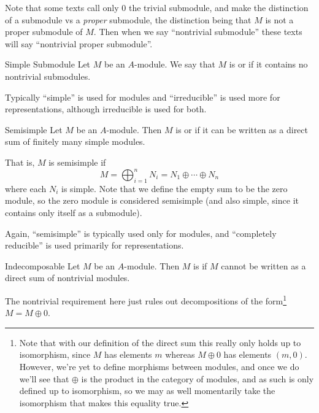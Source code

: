 \documentclass[fleqn]{NotesClass}
\begin{document}
    Note that some texts call only \(0\) the trivial submodule, and make the distinction of a submodule vs a \emph{proper} submodule, the distinction being that \(M\) is not a proper submodule of \(M\).
    Then when we say \enquote{nontrivial submodule} these texts will say \enquote{nontrivial proper submodule}.
    
    \begin{dfn}{Simple Submodule}{}
        Let \(M\) be an \(A\)-module.
        We say that \(M\) is  or  if it contains no nontrivial submodules.
    \end{dfn}
    
    Typically \enquote{simple} is used for modules and \enquote{irreducible} is used more for representations, although irreducible is used for both.
    
    \begin{dfn}{Semisimple}{}
        Let \(M\) be an \(A\)-module.
        Then \(M\) is  or  if it can be written as a direct sum of finitely many simple modules.
    \end{dfn}
    
    That is, \(M\) is semisimple if 
    \begin{equation}
        M = \bigoplus_{i=1}^n N_i = N_1 \oplus \dotsb \oplus N_n
    \end{equation}
    where each \(N_i\) is simple.
    Note that we define the empty sum to be the zero module, so the zero module is considered semisimple (and also simple, since it contains only itself as a submodule).
    
    Again, \enquote{semisimple} is typically used only for modules, and \enquote{completely reducible} is used primarily for representations.
    
    \begin{dfn}{Indecomposable}{}
        Let \(M\) be an \(A\)-module.
        Then \(M\) is  if \(M\) cannot be written as a direct sum of nontrivial modules.
    \end{dfn}
    
    The nontrivial requirement here just rules out decompositions of the form\footnote{Note that with our definition of the direct sum this really only holds up to isomorphism, since \(M\) has elements \(m\) whereas \(M \oplus 0\) has elements \((m, 0)\). However, we're yet to define morphisms between modules, and once we do we'll see that \(\oplus\) is the product in the category of modules, and as such is only defined up to isomorphism, so we may as well momentarily take the isomorphism that makes this equality true.} \(M = M \oplus 0\).
    
\end{document}
